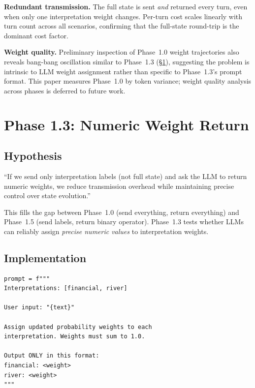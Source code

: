 \documentclass[11pt,a4paper]{article}
\begin{document}
\textbf{Redundant transmission.} The full state is sent \textit{and} returned
every turn, even when only one interpretation weight changes. Per-turn cost scales
linearly with turn count across all scenarios, confirming that the full-state
round-trip is the dominant cost factor.

\textbf{Weight quality.} Preliminary inspection of Phase~1.0 weight trajectories
also reveals bang-bang oscillation similar to Phase~1.3 (§\ref{sec:phase1_3}),
suggesting the problem is intrinsic to LLM weight assignment rather than specific
to Phase~1.3's prompt format. This paper measures Phase~1.0 by token variance;
weight quality analysis across phases is deferred to future work.

\section{Phase 1.3: Numeric Weight Return}
\label{sec:phase1_3}

\subsection{Hypothesis}

``If we send only interpretation labels (not full state) and ask the LLM to return
numeric weights, we reduce transmission overhead while maintaining precise control
over state evolution.''

This fills the gap between Phase~1.0 (send everything, return everything) and
Phase~1.5 (send labels, return binary operator). Phase~1.3 tests whether LLMs
can reliably assign \textit{precise numeric values} to interpretation weights.

\subsection{Implementation}

\begin{lstlisting}
prompt = f"""
Interpretations: [financial, river]

User input: "{text}"

Assign updated probability weights to each
interpretation. Weights must sum to 1.0.

Output ONLY in this format:
financial: <weight>
river: <weight>
"""
\end{lstlisting}
\end{document}
